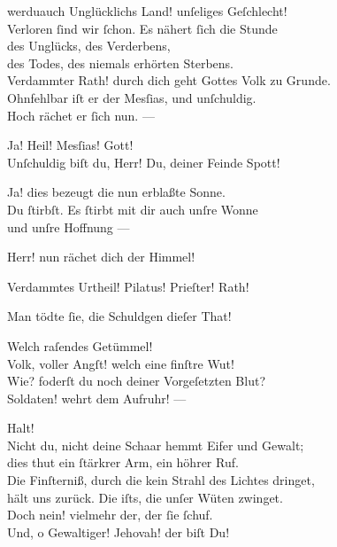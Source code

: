 \documentclass[shorttitlesize=50,tocstyle=ref-genre]{ees}
\begin{document}
{\begin{movement}{werduauch}
    Unglücklichs Land! unſeliges Geſchlecht!\\
    Verloren ſind wir ſchon. Es nähert ſich die Stunde\\
    des Unglücks, des Verderbens,\\
    des Todes, des niemals erhörten Sterbens.\\
    Verdammter Rath! durch dich geht Gottes Volk zu Grunde.\\
    Ohnfehlbar iſt er der Mesſias, und unſchuldig.\\
    Hoch rächet er ſich nun. —

    \hspace*{3cm}Ja! Heil! Mesſias! Gott!\\
    Unſchuldig biſt du, Herr! Du, deiner Feinde Spott!

    Ja! dies bezeugt die nun erblaßte Sonne.\\
    Du ſtirbſt. Es ſtirbt mit dir auch unſre Wonne\\
    und unſre Hoffnung —

    \hspace*{3cm}Herr! nun rächet dich der Himmel!\\\strut

    Verdammtes Urtheil! Pilatus! Prieſter! Rath!\\\strut

    Man tödte ſie, die Schuldgen dieſer That!

    Welch raſendes Getümmel!\\
    Volk, voller Angſt! welch eine finſtre Wut!\\
    Wie? foderſt du noch deiner Vorgeſetzten Blut?\\
    Soldaten! wehrt dem Aufruhr! —

    \hspace*{3cm}Halt!\\
    Nicht du, nicht deine Schaar hemmt Eifer und Gewalt;\\
    dies thut ein ſtärkrer Arm, ein höhrer Ruf.\\
    Die Finſterniß, durch die kein Strahl des Lichtes dringet,\\
    hält uns zurück. Die iſts, die unſer Wüten zwinget.\\
    Doch nein! vielmehr der, der ſie ſchuf.\\
    Und, o Gewaltiger! Jehovah! der biſt Du!


\end{movement}}
\end{document}
